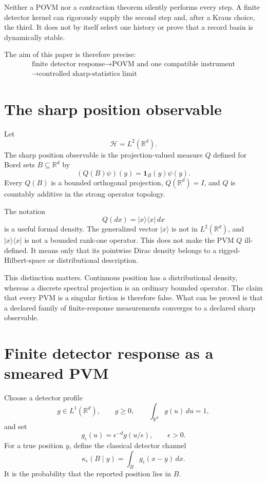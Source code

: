 \documentclass[11pt]{article}
\newcommand{\Hh}{\mathcal H}
\begin{document}
Neither a POVM nor a contraction theorem silently performs every step. A
finite detector kernel can rigorously supply the second step and, after a
Kraus choice, the third. It does not by itself select one history or prove
that a record basin is dynamically stable.

The aim of this paper is therefore precise:
\[
\boxed{
\begin{gathered}
\text{finite detector response}
\longrightarrow
\text{POVM and one compatible instrument}\\
\longrightarrow
\text{controlled sharp-statistics limit}
\end{gathered}
}
\]

\section{The sharp position observable}

Let
\[
\Hh=L^2(\mathbb R^d).
\]
The sharp position observable is the projection-valued measure \(Q\) defined
for Borel sets \(B\subseteq\mathbb R^d\) by
\[
(Q(B)\psi)(y)=\mathbf 1_B(y)\psi(y).
\]
Every \(Q(B)\) is a bounded orthogonal projection, \(Q(\mathbb R^d)=I\), and
\(Q\) is countably additive in the strong operator topology.

The notation
\[
Q(dx)=|x\rangle\langle x|\,dx
\]
is a useful formal density. The generalized vector \(|x\rangle\) is not in
\(L^2(\mathbb R^d)\), and \(|x\rangle\langle x|\) is not a bounded rank-one
operator. This does not make the PVM \(Q\) ill-defined. It means only that its
pointwise Dirac density belongs to a rigged-Hilbert-space or distributional
description.

This distinction matters. Continuous position has a distributional density,
whereas a discrete spectral projection is an ordinary bounded operator. The
claim that every PVM is a singular fiction is therefore false. What can be
proved is that a declared family of finite-response measurements converges to
a declared sharp observable.

\section{Finite detector response as a smeared PVM}

Choose a detector profile
\[
g\in L^1(\mathbb R^d),\qquad
g\geq0,\qquad
\int_{\mathbb R^d}g(u)\,du=1,
\]
and set
\[
g_\epsilon(u)=\epsilon^{-d}g(u/\epsilon),
\qquad \epsilon>0.
\]
For a true position \(y\), define the classical detector channel
\[
\kappa_\epsilon(B\mid y)
=\int_B g_\epsilon(x-y)\,dx.
\]
It is the probability that the reported position lies in \(B\).
\end{document}
